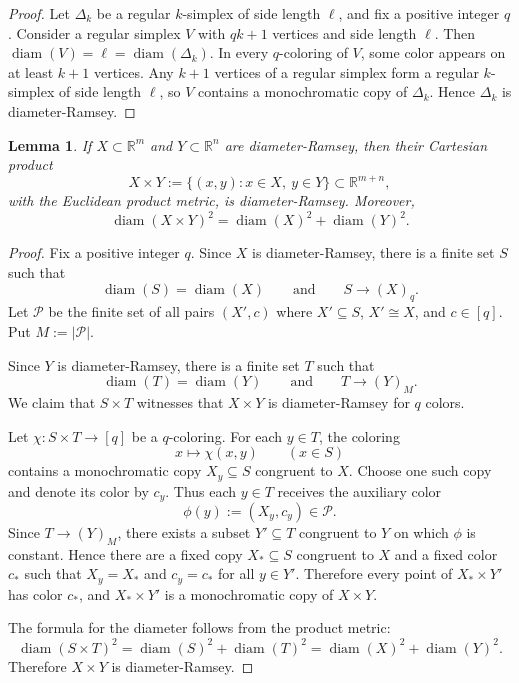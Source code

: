 \documentclass[preprint,12pt]{elsarticle}
\newtheorem{lemma}[theorem]{Lemma}
\theoremstyle{remark}
\DeclareMathOperator{\diam}{diam}
\begin{document}
\begin{proof}
Let $\Delta_k$ be a regular $k$-simplex of side length $\ell$, and fix a positive integer $q$. Consider a regular simplex $V$ with $qk+1$ vertices and side length $\ell$. Then $\diam(V)=\ell=\diam(\Delta_k)$. In every $q$-coloring of $V$, some color appears on at least $k+1$ vertices. Any $k+1$ vertices of a regular simplex form a regular $k$-simplex of side length $\ell$, so $V$ contains a monochromatic copy of $\Delta_k$. Hence $\Delta_k$ is diameter-Ramsey.
\end{proof}

\begin{lemma}\label{lem:product}
If $X\subset\mathbb R^m$ and $Y\subset\mathbb R^n$ are diameter-Ramsey, then their Cartesian product
\[
X\times Y:=\{(x,y):x\in X,\ y\in Y\}\subset\mathbb R^{m+n},
\]
with the Euclidean product metric, is diameter-Ramsey. Moreover,
\[
\diam(X\times Y)^2=\diam(X)^2+\diam(Y)^2.
\]
\end{lemma}

\begin{proof}
Fix a positive integer $q$. Since $X$ is diameter-Ramsey, there is a finite set $S$ such that
\[
\diam(S)=\diam(X)
\qquad\text{and}\qquad
S\to(X)_q.
\]
Let $\mathcal P$ be the finite set of all pairs $(X',c)$ where $X'\subseteq S$, $X'\cong X$, and $c\in[q]$. Put $M:=|\mathcal P|$.

Since $Y$ is diameter-Ramsey, there is a finite set $T$ such that
\[
\diam(T)=\diam(Y)
\qquad\text{and}\qquad
T\to(Y)_M.
\]
We claim that $S\times T$ witnesses that $X\times Y$ is diameter-Ramsey for $q$ colors.

Let $\chi:S\times T\to[q]$ be a $q$-coloring. For each $y\in T$, the coloring
\[
x\longmapsto \chi(x,y)\qquad (x\in S)
\]
contains a monochromatic copy $X_y\subseteq S$ congruent to $X$. Choose one such copy and denote its color by $c_y$. Thus each $y\in T$ receives the auxiliary color
\[
\phi(y):=(X_y,c_y)\in\mathcal P.
\]
Since $T\to(Y)_M$, there exists a subset $Y'\subseteq T$ congruent to $Y$ on which $\phi$ is constant. Hence there are a fixed copy $X_*\subseteq S$ congruent to $X$ and a fixed color $c_*$ such that $X_y=X_*$ and $c_y=c_*$ for all $y\in Y'$. Therefore every point of $X_*\times Y'$ has color $c_*$, and $X_*\times Y'$ is a monochromatic copy of $X\times Y$.

The formula for the diameter follows from the product metric:
\[
\diam(S\times T)^2=\diam(S)^2+\diam(T)^2
=\diam(X)^2+\diam(Y)^2.
\]
Therefore $X\times Y$ is diameter-Ramsey.
\end{proof}
\end{document}
